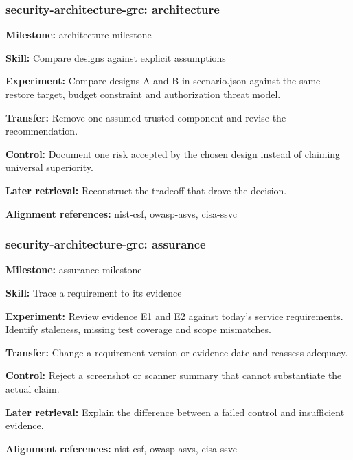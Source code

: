 \subsubsection{security-architecture-grc: architecture}
\noindent\textbf{Milestone:} architecture-milestone\par
\noindent\textbf{Skill:} Compare designs against explicit assumptions\par
\noindent\textbf{Experiment:} Compare designs A and B in scenario.json against the same restore target, budget constraint and authorization threat model.\par
\noindent\textbf{Transfer:} Remove one assumed trusted component and revise the recommendation.\par
\noindent\textbf{Control:} Document one risk accepted by the chosen design instead of claiming universal superiority.\par
\noindent\textbf{Later retrieval:} Reconstruct the tradeoff that drove the decision.\par
\noindent\textbf{Alignment references:} nist-csf, owasp-asvs, cisa-ssvc\par
\subsubsection{security-architecture-grc: assurance}
\noindent\textbf{Milestone:} assurance-milestone\par
\noindent\textbf{Skill:} Trace a requirement to its evidence\par
\noindent\textbf{Experiment:} Review evidence E1 and E2 against today’s service requirements. Identify staleness, missing test coverage and scope mismatches.\par
\noindent\textbf{Transfer:} Change a requirement version or evidence date and reassess adequacy.\par
\noindent\textbf{Control:} Reject a screenshot or scanner summary that cannot substantiate the actual claim.\par
\noindent\textbf{Later retrieval:} Explain the difference between a failed control and insufficient evidence.\par
\noindent\textbf{Alignment references:} nist-csf, owasp-asvs, cisa-ssvc\par
